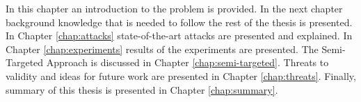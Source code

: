 In this chapter an introduction to the problem is provided. In the next chapter background knowledge that is needed to follow the rest of the thesis is presented. In Chapter \ref{chap:attacks} state-of-the-art attacks are presented and explained. In Chapter \ref{chap:experiments} results of the experiments are presented. The Semi-Targeted Approach is discussed in Chapter \ref{chap:semi-targeted}. Threats to validity and ideas for future work are presented in Chapter \ref{chap:threats}. Finally, summary of this thesis is presented in Chapter \ref{chap:summary}.